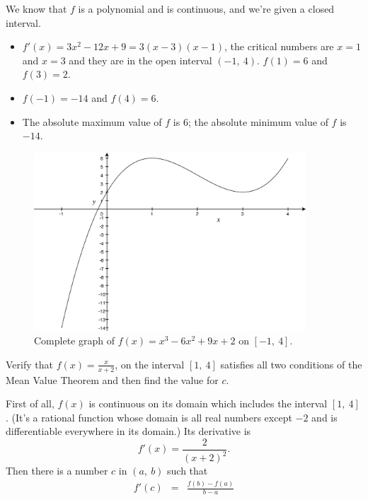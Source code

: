 \documentclass[12pt,addpoints, answers, fleqn]{exam}
\begin{document}
\begin{questions}
\begin{solution}
We know that $f$ is a polynomial and is continuous, and we're given a closed interval.
\begin{itemize}
\item $f' \left( x \right) = 3x^2 - 12x + 9 = 3 \left(x -3 \right)\left(x - 1\right)$, the critical numbers are $x = 1$ and $x = 3$ and they are in the open interval $\left( -1, \ 4 \right)$. $f \left( 1 \right) = 6$ and $f \left( 3 \right) = 2$.
\item $f \left( -1 \right) = -14$ and $f \left( 4 \right) = 6$.
\item The absolute maximum value of $f$ is $6$; the absolute minimum value of $f$ is $-14$.
\end{itemize}
\end{solution}
\begin{figure}[htbp] %
   \centering
   \includegraphics[width=4in]{./graphics/graph21011.pdf} 
   \caption{Complete graph of $f \left( x \right) = x^3 - 6x^2 + 9x +2$ on $\left[ -1, \ 4 \right]$.}
   \label{fig:graph21011}
\end{figure}

\question Verify that $f\left( x \right) = \displaystyle \frac{x}{x+2}$, on the interval $\left[ 1, \ 4 \right]$ satisfies all two conditions of the   Mean Value Theorem and then find the value for $c$.

\begin{solution}
First of all, $f\left( x \right)$ is continuous on its domain which includes the interval $\left[ 1, \ 4 \right]$. (It's a rational function whose domain is all real numbers except $-2$ and is differentiable everywhere in its domain.) Its derivative is
\[
f'\left( x \right) =  \frac{2}{\left(x+2\right)^2}.
\]
Then there is a number $c$ in $\left( a, \ b \right)$ such that
\begin{eqnarray*}
f'\left( c \right) &=& \frac{f\left(b\right) - f\left(a\right)}{b-a}\\
\end{eqnarray*}


\end{solution}
\end{questions}
\end{document}
